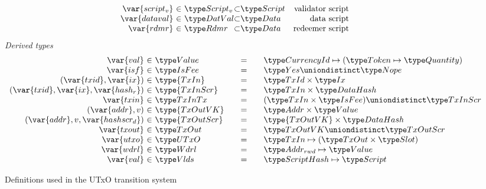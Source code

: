 \begin{figure*}[htb]
\begin{equation*}
\begin{array}{r@{~\in~}l@{\subset}lr}
      \var{script_v}&\ScriptV & \Script & \text{validator script}\\
      \var{dataval}&\DatVal & \Data & \text{data script}\\
      \var{rdmr}&\Rdmr & \Data & \text{redeemer script}\\
    \end{array}
  \end{equation*}
%
  \emph{Derived types}
  \begin{equation*}
    \begin{array}{r@{~\in~}l@{\qquad=\qquad}lr}
      \var{val} & \Value
      & \CurrencyId \mapsto (\Token \mapsto \Quantity)
      \\
      \var{isf}
      & \IsFee
      & \Yes \uniondistinct \Nope
      \\
      (\var{txid}, \var{ix})
      & \type{TxIn}
      & \TxId \times \Ix
      \\
      (\var{txid}, \var{ix}, \var{hash_r})
      & \type{TxInScr}
      & \TxIn \times \HashDat
      \\
      \var{txin}
      & \TxInTx
      & (\TxIn \times \IsFee) \uniondistinct \TxInScr
      \\
      (\var{addr}, v)
      & \type{TxOutVK}
      & \Addr \times \Value
      \\
      (\var{addr}, v, \var{hashscr_d})
      & \type{TxOutScr}
      & \type{TxOutVK} \times \HashDat
      \\
      \var{txout}
      & \TxOut
      & \TxOutVK \uniondistinct \TxOutScr
      \\
      \var{utxo}
      & \UTxO
      & \TxIn \mapsto (\TxOut \times \Slot)
      \\
      \var{wdrl}
      & \Wdrl
      & \AddrRWD \mapsto \Value
      \\
      \var{val}
      & \Vlds
      & \HashScr \mapsto \Script
    \end{array}
  \end{equation*}
  \caption{Definitions used in the UTxO transition system}
  \label{fig:defs:utxo-shelley-1}
\end{figure*}

